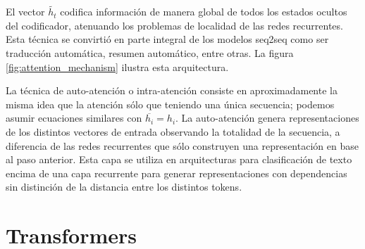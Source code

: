 El vector $\widetilde{h_t}$ codifica información de manera global de todos los estados ocultos del codificador, atenuando los problemas de localidad de las redes recurrentes. Esta técnica se convirtió en parte integral de los modelos seq2seq como ser traducción automática, resumen automático, entre otras. La figura \ref{fig:attention_mechanism} ilustra esta arquitectura.

La técnica de auto-atención o intra-atención \cite{parikh-etal-2016-decomposable} consiste en aproximadamente la misma idea que la atención sólo que teniendo una única secuencia; podemos asumir ecuaciones similares con $\overline{h_i} = h_i$. La auto-atención genera representaciones de los distintos vectores de entrada observando la totalidad de la secuencia, a diferencia de las redes recurrentes que sólo construyen una representación en base al paso anterior. Esta capa se utiliza en arquitecturas para clasificación de texto encima de una capa recurrente para generar representaciones con dependencias sin distinción de la distancia entre los distintos tokens.

\section{Transformers}

